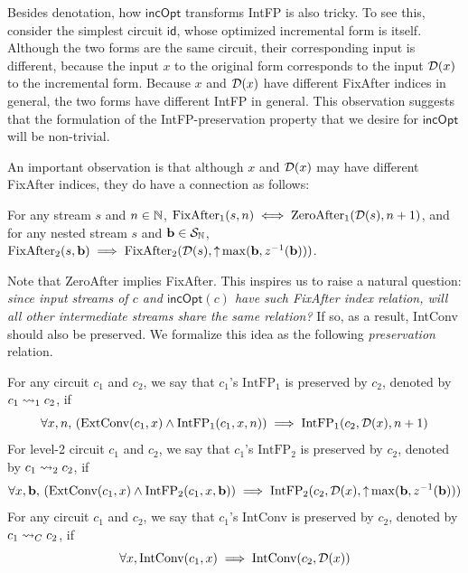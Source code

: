 Besides denotation, how $\mathsf{incOpt}$ transforms IntFP is also tricky.
To see this, consider the simplest circuit $\mathsf{id}$, whose optimized incremental form is itself. Although the two forms are the same circuit, their corresponding input is different, because the input $x$ to the original form corresponds to the input $\mathcal{D}(x)$ to the incremental form. Because $x$ and $\mathcal{D}(x)$ have different FixAfter indices in general, the two forms have different IntFP in general.
This observation suggests that the formulation of the IntFP-preservation property that we desire for $\mathsf{incOpt}$ will be non-trivial.


An important observation is that although $x$ and $\mathcal{D}(x)$ may have different FixAfter indices, they do have a connection as follows:
\begin{proposition}
    For any stream $s$ and $n \in \mathbb{N}$, $\text{FixAfter}_1(s, n) \iff \text{ZeroAfter}_1(\mathcal{D}(s), n + 1)$,
    and for any nested stream $s$ and $\mathbf{b} \in \mathcal{S}_{\mathbb{N}}$, 
    $\text{FixAfter}_2(s, \mathbf{b}) \implies \text{FixAfter}_2(\mathcal{D}(s), {\uparrow}\max(\mathbf{b}, z^{-1}(\mathbf{b})))$.
\end{proposition}

Note that ZeroAfter implies FixAfter. This inspires us to raise a natural question: \emph{since input streams of $c$ and $\mathsf{incOpt}(c)$ have such FixAfter index relation, will all other intermediate streams share the same relation?} If so, as a result, IntConv should also be preserved. We formalize this idea as the following \emph{preservation} relation. 
\begin{definition}
    For any circuit $c_1$ and $c_2$, we say that $c_1$'s $\text{IntFP}_1$ is preserved by $c_2$, denoted by $c_1 \rightsquigarrow_1 c_2$, if 
    \[\forall x, n,\, (\text{ExtConv}(c_1, x) \land \text{IntFP}_1(c_1, x, n)) \implies \text{IntFP}_1(c_2, \mathcal{D}(x), n + 1)\]
    For level-2 circuit $c_1$ and $c_2$, we say that $c_1$'s $\text{IntFP}_2$ is preserved by $c_2$, denoted by $c_1 \rightsquigarrow_2 c_2$, if
    \[\forall x, \mathbf{b},\, (\text{ExtConv}(c_1, x) \land \text{IntFP}_2(c_1, x, \mathbf{b})) \implies \text{IntFP}_2(c_2, \mathcal{D}(x), {\uparrow}\max(\mathbf{b}, z^{-1}(\mathbf{b})))\]
    For any circuit $c_1$ and $c_2$, we say that $c_1$'s IntConv is preserved by $c_2$, denoted by $c_1 \rightsquigarrow_{C} c_2$, if
    \[\forall x, \text{IntConv}(c_1, x) \implies \text{IntConv}(c_2, \mathcal{D}(x))\]
\end{definition}

